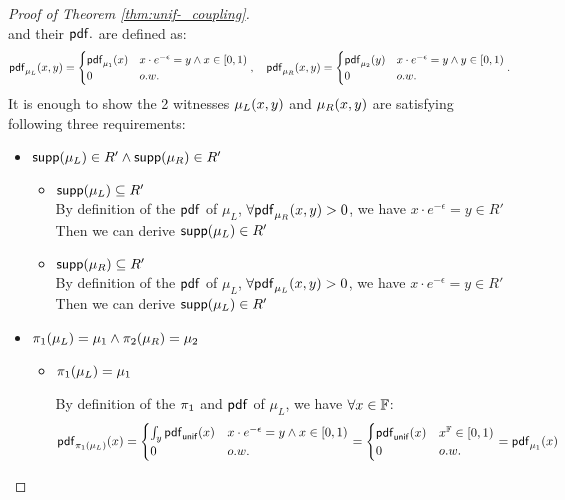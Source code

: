 \documentclass[a4paper,11pt]{article}
\begin{document}
\begin{proof}[Proof of Theorem \ref{thm:unif-_coupling}]
\[\]
%
%
and their $\mathsf{pdf}.$ are defined as:
\[
	\mathsf{pdf}_{\mu_L}(x, y) = 
	\begin{cases}
	\mathsf{pdf}_{\mu_1}(x) & x \cdot e^{-\epsilon} = y  \land x \in [0, 1)\\
	0       & o.w.
	\end{cases},
~~~
	\mathsf{pdf}_{\mu_R}(x, y) = 
	\begin{cases}
	\mathsf{pdf}_{\mu_2}(y) & x \cdot e^{-\epsilon} = y  \land y \in [0, 1)\\
	0       & o.w.
	\end{cases}.
\]
It is enough to show the 2 witnesses $\mu_L(x, y)$ and $\mu_R(x, y)$ are satisfying following three requirements:
\begin{itemize}
	\item $\mathsf{supp}(\mu_L) \in R' \land \mathsf{supp}(\mu_R) \in R'$

	\begin{itemize}
		\item $\mathsf{supp}(\mu_L) \subseteq R'$ 
		\\
		By definition of the $\mathsf{pdf}$ of $\mu_L$, 
		$\forall \mathsf{pdf}_{\mu_R}(x, y) > 0$,
		we have 
		$x \cdot e^{-\epsilon} = y  \in R'$ 
		\\%
		Then we can derive $\mathsf{supp}(\mu_L) \in R'$
		\item $\mathsf{supp}(\mu_R) \subseteq R'$
		\\
		By definition of the $\mathsf{pdf}$ of $\mu_L$, 
		$\forall \mathsf{pdf}_{\mu_L}(x, y) > 0$,
		we have
		$x \cdot e^{-\epsilon} = y \in R'$ 
		\\
		Then we can derive $\mathsf{supp}(\mu_L) \in R'$
	\end{itemize}		
%
	\item $\pi_1(\mu_L) = \mu_1 \land \pi_2(\mu_R) = \mu_2$
	
	\begin{itemize}
		\item $\pi_1(\mu_L) = \mu_1$ 


		By definition of the $\pi_1$ and $\mathsf{pdf}$ of $\mu_L$, we have $\forall x  \in \mathbb{F}$:
		\[
			\mathsf{pdf}_{\pi_1(\mu_L)}(x) = 
			\begin{cases}
			\int_{y}\mathsf{pdf}_{\mathsf{unif}}(x) 
			& x \cdot e^{-\epsilon}  = y 
			\land x \in [0, 1)\\
			0       & o.w.
			\end{cases} 
			= 
			\begin{cases}
			\mathsf{pdf}_{\mathsf{unif}}(x) & x^{\mathbb{F}} \in [0, 1)\\
			0       & o.w.
			\end{cases}
			=
			\mathsf{pdf}_{\mu_1}(x)
		\]


\end{itemize}
\end{itemize}
\end{proof}
\end{document}
